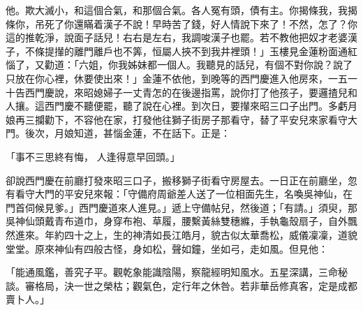 \begin{showcontents}{}
他。欺大滅小，和這個合氣，和那個合氣。各人冤有頭，債有主。你揭條我，我揭條你，吊死了你還瞞着漢子不說！早時苦了錢，好人情說下來了！不然，怎了？你這的推乾淨，說面子話兒！右右是左右，我調唆漢子也罷。若不教他把奴才老婆漢子，不條提攆的離門離戶也不筭，恒屬人挾不到我井裡頭！」玉樓見金蓮粉面通紅惱了，又勸道：「六姐，你我姊妹都一個人。我聽見的話兒，有個不對你說？說了只放在你心裡，休要使出來！」金蓮不依他，到晚等的西門慶進入他房來，一五一十告西門慶說，來昭媳婦子一丈青怎的在後邊指罵，說你打了他孩子，要邏揸兒和人攘。這西門慶不聽便罷，聽了說在心裡。到次日，要攆來昭三口子出門。多虧月娘再三攔勸下，不容他在家，打發他往獅子街房子那看守，替了平安兒來家看守大門。後次，月娘知道，甚惱金蓮，不在話下。正是：

「事不三思終有悔，  人逢得意早回頭。」

卻說西門慶在前廳打發來昭三口子，搬移獅子街看守房屋去。一日正在前廳坐，忽有看守大門的平安兒來報：「守備府周爺差人送了一位相面先生，名喚吳神仙，在門首伺候見爹。」西門慶道來人進見。」遞上守備帖兒，然後道；「有請。」須臾，那吳神仙頭戴青布道巾，身穿布袍、草履，腰繫黃絲雙穗縧，手執龜殼扇子，自外飄然進來。年約四十之上，生的神清如長江皓月，貌古似太華喬松，威儀凜凜，道貌堂堂。原來神仙有四般古怪，身如松，聲如鐘，坐如弓，走如風。但見他：

「能通風鑑，善究子平。觀乾象能識陰陽，察龍經明知風水。五星深講，三命秘談。審格局，決一世之榮枯；觀氣色，定行年之休咎。若非華岳修真客，定是成都賣卜人。」


\end{showcontents}
